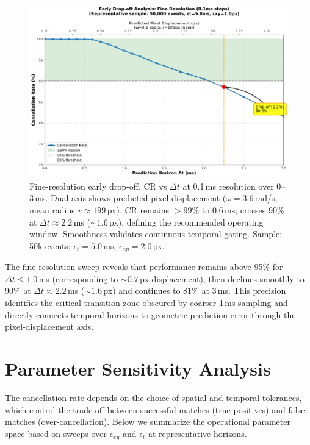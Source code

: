 \begin{figure}[t]
  \centering
  \includegraphics[width=0.95\linewidth]{images/results_figures/fine_resolution_dropoff.png}
\caption{Fine-resolution early drop-off. CR vs $\Delta t$ at 0.1\,ms resolution over 0--3\,ms. Dual axis shows predicted pixel displacement ($\omega=3.6$\,rad/s, mean radius $r\approx 199$\,px). CR remains $>99\%$ to 0.6\,ms, crosses 90\% at $\Delta t \approx 2.2$\,ms ($\sim 1.6$\,px), defining the recommended operating window. Smoothness validates continuous temporal gating. Sample: 50k events; $\epsilon_t=5.0$\,ms, $\epsilon_{xy}=2.0$\,px.
}
  \label{fig:fine_dropoff}
\end{figure}

The fine-resolution sweep reveals that performance remains above 95\% for $\Delta t \leq 1.0$\,ms (corresponding to $\sim 0.7$\,px displacement), then declines smoothly to 90\% at $\Delta t \approx 2.2$\,ms ($\sim 1.6$\,px) and continues to 81\% at 3\,ms. This precision identifies the critical transition zone obscured by coarser 1\,ms sampling and directly connects temporal horizons to geometric prediction error through the pixel-displacement axis.

\section{Parameter Sensitivity Analysis}

The cancellation rate depends on the choice of spatial and temporal tolerances, which control the trade-off between successful matches (true positives) and false matches (over-cancellation). Below we summarize the operational parameter space based on sweeps over $\epsilon_{xy}$ and $\epsilon_t$ at representative horizons.



